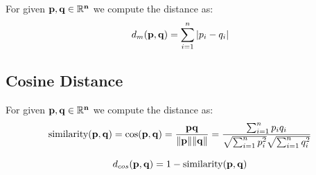 For given $\bf{p}, \bf{q} \in \mathbb{R}^n$ we compute the distance as:
\begin{equation}
d_m({\bf p},{\bf q}) = {\sum_{i=1}^n |p_i - q_i|}    
\end{equation}


\subsection{Cosine Distance}

For given $\bf{p}, \bf{q} \in \mathbb{R}^n$ we compute the distance as:
\begin{equation}
\text{similarity}({\bf p},{\bf q}) = \cos ({\bf p},{\bf q})= {{\bf p} {\bf q} \over \|{\bf p}\| \|{\bf q}\|} = \frac{ \sum_{i=1}^{n}{p_i q_i} }{ \sqrt{\sum_{i=1}^{n}{p_i^2}} \sqrt{\sum_{i=1}^{n}{q_i^2}} }
\end{equation}

\begin{equation}
    d_{cos}({\bf p},{\bf q}) = 1 - \text{similarity}({\bf p},{\bf q})
\end{equation}